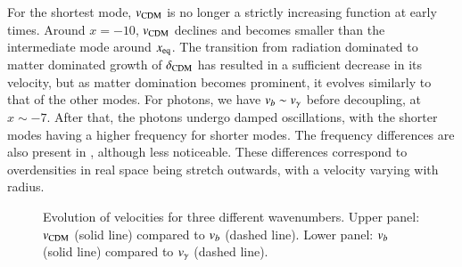 For the shortest mode, $v_\mathrm{CDM}$ is no longer a strictly increasing function at early times. Around $x=-10$, $v_\mathrm{CDM}$ declines and becomes smaller than the intermediate mode around $x_\mathrm{eq}$. The transition from radiation dominated to matter dominated growth of $\delta_\mathrm{CDM}$ has resulted in a sufficient decrease in its velocity, but as matter domination becomes prominent, it evolves similarly to that of the other modes. For photons, we have $v_b\sim v_\gamma$ before decoupling, at $x\sim-7$. After that, the photons undergo damped oscillations, with the shorter modes having a higher frequency for shorter modes. The frequency differences are also present in , although less noticeable. These differences correspond to overdensities in real space being stretch outwards, with a velocity varying with radius.   

\begin{figure}[ht!]
    \caption{Evolution of velocities for three different wavenumbers. Upper panel: $v_\mathrm{CDM}$ (solid line) compared to $v_b$ (dashed line). Lower panel: $v_b$ (solid line) compared to $v_\gamma$ (dashed line).}
    \label{fig:M3:results:vels}
\end{figure}


